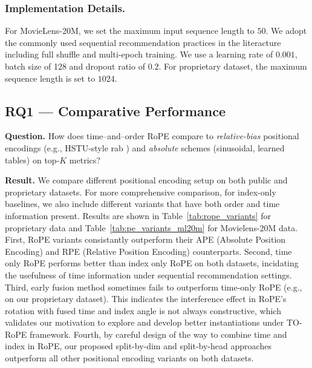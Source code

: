 \documentclass[sigconf]{acmart}
\begin{document}
\subsubsection{Implementation Details.}
\label{par:hyperparams}
For MovieLens-20M, we set the maximum input sequence length to $50$. We adopt the commonly used sequential recommendation practices \cite{Kang2018SasRec} in the literacture including full shuffle and multi-epoch training. We use a learning rate of $0.001$, batch size of 128 and dropout ratio of $0.2$. For proprietary dataset, the maximum sequence length is set to $1024$. 


\subsection{RQ1 — Comparative Performance}
\textbf{Question.} How does time–and–order RoPE compare to \emph{relative-bias} positional encodings (e.g., HSTU-style rab \cite{Zhai2024ActionsSL}) and \emph{absolute} schemes (sinusoidal, learned tables) on top-$K$ metrics?

\noindent\textbf{Result.} We compare different positional encoding setup on both public and proprietary datasets. For more comprehensive comparison, for index-only baselines, we also include different variants that have both order and time information present. Results are shown in Table~\ref{tab:rope_variants} for proprietary data and Table~\ref{tab:pe_variants_ml20m} for Movielens-20M data. First, RoPE variants consistantly outperform their APE (Absolute Position Encoding) and RPE (Relative Position Encoding) counterparts. Second, time only RoPE performs better than index only RoPE on both datasets, incidating the usefulness of time information under sequential recommendation settings. Third, early fusion method sometimes fails to outperform time-only RoPE (e.g., on our proprietary dataset). This indicates the interference effect in RoPE's rotation with fused time and index angle is not always constructive, which validates our motivation to explore and develop better instantiations under TO-RoPE framework. Fourth, by careful design of the way to combine time and index in RoPE, our proposed split-by-dim and split-by-head approaches outperform all other positional encoding variants on both datasets.
\end{document}
